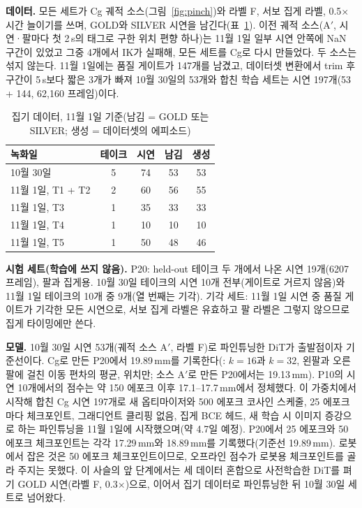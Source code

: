 \documentclass[conference,10pt]{IEEEtran}
\newcommand{\mm}{\,mm\xspace}
\begin{document}
\textbf{데이터.} 모든 세트가 Cg 궤적 소스(그림~\ref{fig:pinch})와 라벨 F, 서보 집게 라벨, 0.5$\times$ 시간 늘이기를 쓰며, GOLD와
SILVER 시연을 남긴다(표~\ref{tab:pinch}). 이전 궤적 소스(A$'$, 시연·팔마다 첫 2\,s의 태그로 구한 위치 편향 하나)는 11월 1일 일부
시연 안쪽에 NaN 구간이 있었고 그중 4개에서 IK가 실패해, 모든 세트를 Cg로 다시 만들었다. 두 소스는 섞지 않는다. 11월 1일에는 품질
게이트가 147개를 남겼고, 데이터셋 변환에서 trim 후 구간이 5\,s보다 짧은 3개가 빠져 10월 30일의 53개와 합친 학습 세트는 시연
197개(53 + 144, 62,160 프레임)이다.

\begin{table}[t]
\caption{집기 데이터, 11월 1일 기준(남김 = GOLD 또는 SILVER; 생성 = 데이터셋의 에피소드)}\label{tab:pinch}
\centering\small
\begin{tabular}{@{}lcccc@{}}
\toprule
녹화일 & 테이크 & 시연 & 남김 & 생성 \\
\midrule
10월 30일 & 5 & 74 & 53 & 53 \\
11월 1일, T1 + T2 & 2 & 60 & 56 & 55 \\
11월 1일, T3 & 1 & 35 & 33 & 33 \\
11월 1일, T4 & 1 & 10 & 10 & 10 \\
11월 1일, T5 & 1 & 50 & 48 & 46 \\
\bottomrule
\end{tabular}
\end{table}

\textbf{시험 세트(학습에 쓰지 않음).} P20: held-out 테이크 두 개에서 나온 시연 19개(6207 프레임), 팔과 집게용. 10월 30일 테이크의
시연 10개 전부(게이트로 거르지 않음)와 11월 1일 테이크의 10개 중 9개(열 번째는 기각). 기각 세트: 11월 1일 시연 중 품질 게이트가 기각한 모든 시연으로, 서보 집게
라벨은 유효하고 팔 라벨은 그렇지 않으므로 집게 타이밍에만 쓴다.

\textbf{모델.} 10월 30일 시연 53개(궤적 소스 A$'$, 라벨 F)로 파인튜닝한 DiT가 출발점이자 기준선이다. Cg로 만든 P20에서 19.89\mm{}를
기록한다(: $k=16$과 $k=32$, 왼팔과 오른팔에 걸친 이동 편차의 평균, 위치만; 소스 A$'$로 만든 P20에서는 19.13\mm). P10의 시연 10개에서의 점수는
약 150 에포크 이후 17.1--17.7\mm{}에서 정체했다. 이 가중치에서 시작해 합친 Cg 시연 197개로 새 옵티마이저와 500 에포크 코사인 스케줄,
25 에포크마다 체크포인트, 그래디언트 클리핑 없음, 집게 BCE 헤드, 새 학습 시 이미지 증강으로 하는 파인튜닝을 11월 1일에 시작했으며(약
4.7일 예정). P20에서 25 에포크와 50 에포크 체크포인트는 각각 17.29\mm{}와 18.89\mm{}를 기록했다(기준선 19.89\mm).
로봇에서 잡은 것은 50 에포크 체크포인트이므로, 오프라인 점수가 로봇용 체크포인트를 골라 주지는 못했다. 이 사슬의 앞 단계에서는 세 데이터 혼합으로 사전학습한 DiT를 펴기 GOLD 시연(라벨 F, 0.3$\times$)으로,
이어서 집기 데이터로 파인튜닝한 뒤 10월 30일 세트로 넘어왔다.
\end{document}
